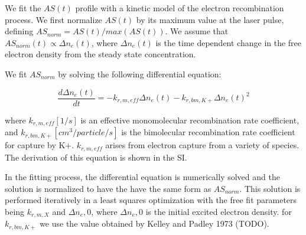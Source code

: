 

We fit the $AS (t)$ profile with a kinetic model of the electron recombination process. We first normalize $AS (t)$ by its maximum value at the laser pulse, defining $AS_{norm} = AS(t)/max(AS(t))$. We assume that $AS_{norm}(t) \propto \Delta n_e (t)$, where $\Delta n_e (t)$ is the time dependent change in the free electron density from the steady state concentration. 

We fit $AS_{norm}$ by solving the following differential equation: 

\begin{equation}
    \label{eq:fit_eq}
    \frac{d\Delta n_e (t)}{dt} = - k_{r, m, eff} \Delta n_e (t) - k_{r, bm, K+}\Delta{n_e (t)}^2
\end{equation}

where $k_{r, m, eff} [1/s]$ is an effective monomolecular recombination rate coefficient, and $k_{r, bm, K+} [cm^3/particle/s]$ is the bimolecular recombination rate coefficient for capture by K+. $k_{r, m, eff}$ arises from electron capture from a variety of species. The derivation of this equation is shown in the SI.

In the fitting process, the differential equation is numerically solved and the solution is normalized to have the have the same form as $AS_{norm}$. This solution is performed iteratively in a least squares optimization with the free fit parameters being $k_{r,m,X}$ and $\Delta{n_e,0}$, where $\Delta{n_e,0}$ is the initial excited electron density. for $k_{r, bm, K+}$ we use the value obtained by Kelley and Padley 1973 (TODO).


